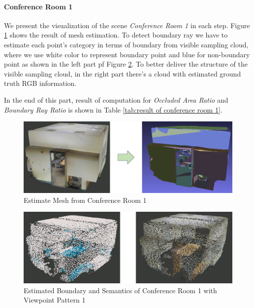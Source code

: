 \documentclass[11pt, a4paper,oneside,chapterprefix=false]{scrbook}
\begin{document}
\paragraph{Conference Room 1} \label{par:conf1 result}

We present the visualization of the scene \textit{Conference Room 1} in each step. Figure \ref{fig:estimate mesh from conference room 1} shows the result of mesh estimation. To detect boundary ray 
we have to estimate each point's category in terms of boundary from visible sampling cloud, where we use white color to represent boundary point and blue for non-boundary point as shown in the left part pf Figure \ref{fig:conf1 0}. To better deliver the structure of the visible sampling cloud, in the right part there's a cloud with estimated ground truth RGB information.

\vspace{10pt}

In the end of this part, result of computation for \textit{Occluded Area Ratio} and \textit{Boundary Ray Ratio} is shown in Table \ref{tab:result of conference room 1}.

\begin{figure}[H]
    \centering
    \includegraphics*[width=1.0\textwidth]{figures/estimate conf1.png}
    \caption{Estimate Mesh from Conference Room 1}
    \label{fig:estimate mesh from conference room 1}
\end{figure}

\begin{figure}[H]
    \centering
    \includegraphics*[width=1.0\textwidth]{figures/conf1 0.png}
    \caption{Estimated Boundary and Semantics of Conference Room 1 with Viewpoint Pattern 1}
    \label{fig:conf1 0}
\end{figure}
\end{document}
